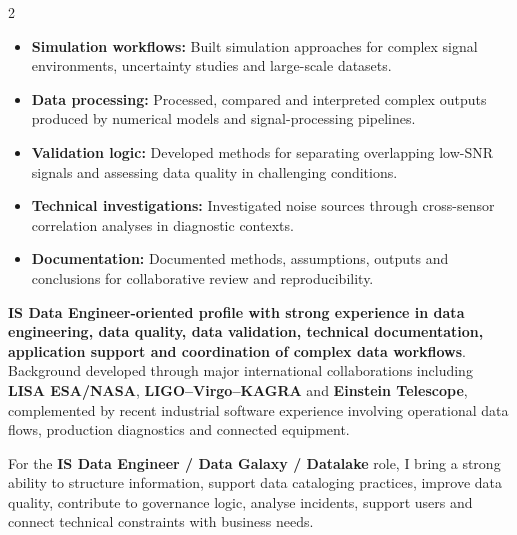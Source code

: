 \documentclass[8pt,a4paper,ragged2e,withhyper]{altacv}
\begin{document}
\begin{paracol}{2}
\begin{itemize}
  \item \textbf{Simulation workflows:} Built simulation approaches for complex signal environments, uncertainty studies and large-scale datasets.
  \item \textbf{Data processing:} Processed, compared and interpreted complex outputs produced by numerical models and signal-processing pipelines.
  \item \textbf{Validation logic:} Developed methods for separating overlapping low-SNR signals and assessing data quality in challenging conditions.
  \item \textbf{Technical investigations:} Investigated noise sources through cross-sensor correlation analyses in diagnostic contexts.
  \item \textbf{Documentation:} Documented methods, assumptions, outputs and conclusions for collaborative review and reproducibility.
\end{itemize}

\switchcolumn


\textbf{IS Data Engineer-oriented profile with strong experience in data engineering, data quality, data validation, technical documentation, application support and coordination of complex data workflows}. Background developed through major international collaborations including \textbf{LISA ESA/NASA}, \textbf{LIGO--Virgo--KAGRA} and \textbf{Einstein Telescope}, complemented by recent industrial software experience involving operational data flows, production diagnostics and connected equipment.

For the \textbf{IS Data Engineer / Data Galaxy / Datalake} role, I bring a strong ability to structure information, support data cataloging practices, improve data quality, contribute to governance logic, analyse incidents, support users and connect technical constraints with business needs.


\end{paracol}
\end{document}
